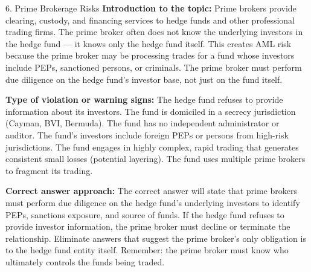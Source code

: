 \documentclass[11pt,a4paper]{beamer}
\begin{document}
\begin{frame}{6. Prime Brokerage Risks}
\tiny
\noindent\textbf{Introduction to the topic:} Prime brokers provide clearing, custody, and financing services to hedge funds and other professional trading firms. The prime broker often does not know the underlying investors in the hedge fund — it knows only the hedge fund itself. This creates AML risk because the prime broker may be processing trades for a fund whose investors include PEPs, sanctioned persons, or criminals. The prime broker must perform due diligence on the hedge fund's investor base, not just on the fund itself.

\vspace{0.1cm}
\noindent\textbf{Type of violation or warning signs:} The hedge fund refuses to provide information about its investors. The fund is domiciled in a secrecy jurisdiction (Cayman, BVI, Bermuda). The fund has no independent administrator or auditor. The fund's investors include foreign PEPs or persons from high-risk jurisdictions. The fund engages in highly complex, rapid trading that generates consistent small losses (potential layering). The fund uses multiple prime brokers to fragment its trading.

\vspace{0.1cm}
\noindent\textbf{Correct answer approach:} The correct answer will state that prime brokers must perform due diligence on the hedge fund's underlying investors to identify PEPs, sanctions exposure, and source of funds. If the hedge fund refuses to provide investor information, the prime broker must decline or terminate the relationship. Eliminate answers that suggest the prime broker's only obligation is to the hedge fund entity itself. Remember: the prime broker must know who ultimately controls the funds being traded.
\end{frame}
\end{document}
